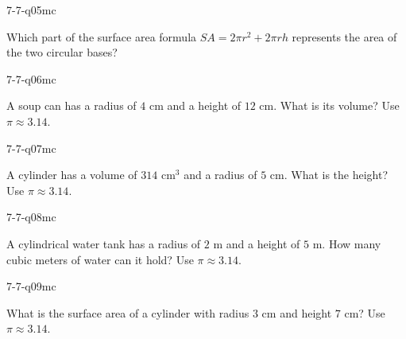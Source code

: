 \begin{practiceQuestion}{7-7-q05}{mc}
\begin{questionText}
Which part of the surface area formula $SA = 2\pi r^2 + 2\pi rh$ represents the area of the two circular bases?
\end{questionText}
\end{practiceQuestion}

\begin{practiceQuestion}{7-7-q06}{mc}
\begin{questionText}
A soup can has a radius of $4$ cm and a height of $12$ cm. What is its volume? Use $\pi \approx 3.14$.
\end{questionText}
\end{practiceQuestion}

\begin{practiceQuestion}{7-7-q07}{mc}
\begin{questionText}
A cylinder has a volume of $314$ cm$^3$ and a radius of $5$ cm. What is the height? Use $\pi \approx 3.14$.
\end{questionText}
\end{practiceQuestion}

\begin{practiceQuestion}{7-7-q08}{mc}
\begin{questionText}
A cylindrical water tank has a radius of $2$ m and a height of $5$ m. How many cubic meters of water can it hold? Use $\pi \approx 3.14$.
\end{questionText}
\end{practiceQuestion}

\begin{practiceQuestion}{7-7-q09}{mc}
\begin{questionText}
What is the surface area of a cylinder with radius $3$ cm and height $7$ cm? Use $\pi \approx 3.14$.
\end{questionText}
\end{practiceQuestion}

